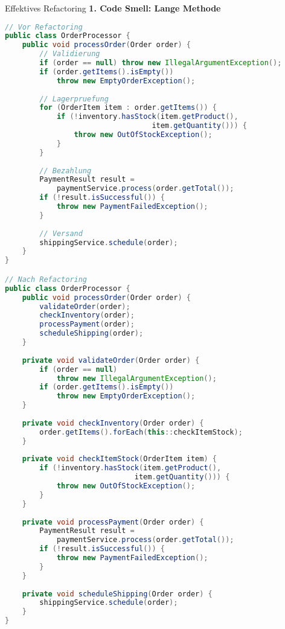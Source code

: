 \begin{KR}{Effektives Refactoring}
\textbf{1. Code Smell: Lange Methode}
\begin{lstlisting}[language=Java]
// Vor Refactoring
public class OrderProcessor {
    public void processOrder(Order order) {
        // Validierung
        if (order == null) throw new IllegalArgumentException();
        if (order.getItems().isEmpty()) 
            throw new EmptyOrderException();
        
        // Lagerpruefung
        for (OrderItem item : order.getItems()) {
            if (!inventory.hasStock(item.getProduct(), 
                                  item.getQuantity())) {
                throw new OutOfStockException();
            }
        }
        
        // Bezahlung
        PaymentResult result = 
            paymentService.process(order.getTotal());
        if (!result.isSuccessful()) {
            throw new PaymentFailedException();
        }
        
        // Versand
        shippingService.schedule(order);
    }
}

// Nach Refactoring
public class OrderProcessor {
    public void processOrder(Order order) {
        validateOrder(order);
        checkInventory(order);
        processPayment(order);
        scheduleShipping(order);
    }
    
    private void validateOrder(Order order) {
        if (order == null) 
            throw new IllegalArgumentException();
        if (order.getItems().isEmpty()) 
            throw new EmptyOrderException();
    }
    
    private void checkInventory(Order order) {
        order.getItems().forEach(this::checkItemStock);
    }
    
    private void checkItemStock(OrderItem item) {
        if (!inventory.hasStock(item.getProduct(), 
                              item.getQuantity())) {
            throw new OutOfStockException();
        }
    }
    
    private void processPayment(Order order) {
        PaymentResult result = 
            paymentService.process(order.getTotal());
        if (!result.isSuccessful()) {
            throw new PaymentFailedException();
        }
    }
    
    private void scheduleShipping(Order order) {
        shippingService.schedule(order);
    }
}
\end{lstlisting}
\end{KR}

